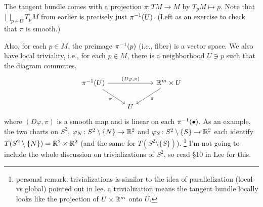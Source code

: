 \begin{remark}
    The tangent bundle comes with a projection $\pi \colon TM \to M$ by $T_p M \mapsto p$. Note that $\bigsqcup_{p \in U} T_p M$ from earlier is precisely just $\pi^{-1} (U)$. (Left as an exercise to check that $\pi$ is smooth.)
\end{remark}
Also, for each $p \in M$, the preimage $\pi^{-1}(p)$ (i.e., fiber) is a vector space. We also have local triviality, i.e., for each $p \in M$, there is a neighborhood $U \ni p$ such that the diagram commutes,
\[ \begin{tikzcd} \pi\inv(U) \arrow[rr, "(D \varphi{,} \pi)"] \arrow[dr, "\pi"'] & & \RR^m \times U \arrow[dl, "\pi"] \\ & U \end{tikzcd} \]
where $(D \varphi, \pi)$ is a smooth map and is linear on each $\pi^{-1}(\bullet)$. As an example, the two charts on $S^2$, $\varphi_N \colon S^2 \setminus \{N\} \to \mathbb R^2$ and $\varphi_S \colon S^2 \setminus \{S\} \to \mathbb R^2$ each identify $T(S^2 \setminus \{N\}) = \mathbb R^2 \times \mathbb R^2$ (and the same for $T(S^2 \setminus \{S\})$). \footnote{personal remark: trivializations is similar to the idea of parallelization (local vs global) pointed out in lee. a trivialization means the tangent bundle locally looks like the projection of $U \times \mathbb R^m$ onto $U$.} I'm not going to include the whole discussion on trivializations of $S^2$, so read \S 10 in Lee for this.

